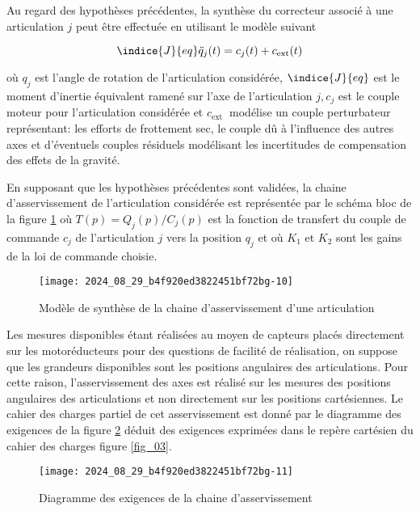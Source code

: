 Au regard des hypothèses précédentes, la synthèse du correcteur associé à une articulation $j$ peut être effectuée en utilisant le modèle suivant

$$
\indice{J}{eq} \ddot{q}_{j}(t)=c_{j}(t)+c_{\mathrm{ext}}(t)
$$

où $q_{j}$ est l'angle de rotation de l'articulation considérée, $\indice{J}{eq}$ est le moment d'inertie équivalent ramené sur l'axe de l'articulation $j, c_{j}$ est le couple moteur pour l'articulation considérée et $c_{\text {ext }}$ modélise un couple perturbateur représentant: les efforts de frottement sec, le couple dû à l'influence des autres axes et d'éventuels couples résiduels modélisant les incertitudes de compensation des effets de la gravité.

En supposant que les hypothèses précédentes sont validées, la chaine d'asservissement de l'articulation considérée est représentée par le schéma bloc de la figure \ref{fig_11} où $T(p)=Q_{j}(p) / C_{j}(p)$ est la fonction de transfert du couple de commande $c_{j}$ de l'articulation $j$ vers la position $q_{j}$ et où $K_{1}$ et $K_{2}$ sont les gains de la loi de commande choisie.

\begin{figure}[!h]
\centering
\texttt{[image: 2024\_08\_29\_b4f920ed3822451bf72bg-10]}
\caption{\label{fig_11}Modèle de synthèse de la chaine d'asservissement d'une articulation}
\end{figure}

Les mesures disponibles étant réalisées au moyen de capteurs placés directement sur les motoréducteurs pour des questions de facilité de réalisation, on suppose que les grandeurs disponibles sont les positions angulaires des articulations. Pour cette raison, l'asservissement des axes est réalisé sur les mesures des positions angulaires des articulations et non directement sur les positions cartésiennes. Le cahier des charges partiel de cet asservissement est donné par le diagramme des exigences de la figure \ref{fig_12} déduit des exigences exprimées dans le repère cartésien du cahier des charges figure \ref{fig_03}.

\begin{figure}[!h]
\centering
\texttt{[image: 2024\_08\_29\_b4f920ed3822451bf72bg-11]}
\caption{\label{fig_12}Diagramme des exigences de la chaine d'asservissement}
\end{figure}

